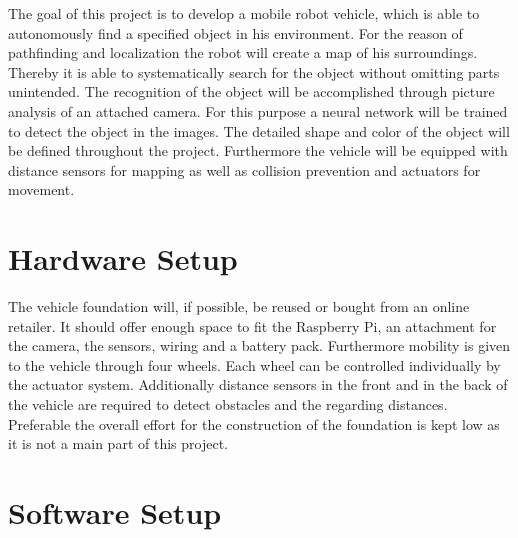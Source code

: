 \documentclass[a4paper,12pt,oneside]{article}
\begin{document}
The goal of this project is to develop a mobile robot vehicle, which is able to autonomously find a specified object in his environment. For the reason of pathfinding and localization the robot will create a map of his surroundings. Thereby it is able to systematically search for the object without omitting parts unintended. The recognition of the object will be accomplished through picture analysis of an attached camera. For this purpose a neural network will be trained to detect the object in the images. The detailed shape and color of the object will be defined throughout the project. Furthermore the vehicle will be equipped with distance sensors for mapping as well as collision prevention and actuators for movement.

\section*{Hardware Setup}

The vehicle foundation will, if possible, be reused or bought from an online retailer. It should offer enough space to fit the Raspberry Pi, an attachment for the camera, the sensors, wiring and a battery pack. Furthermore mobility is given to the vehicle through four wheels. Each wheel can be controlled individually by the actuator system. Additionally distance sensors in the front and in the back of the vehicle are required to detect obstacles and the regarding distances. Preferable the overall effort for the construction of the foundation is kept low as it is not a main part of this project.

\section*{Software Setup}
\end{document}
